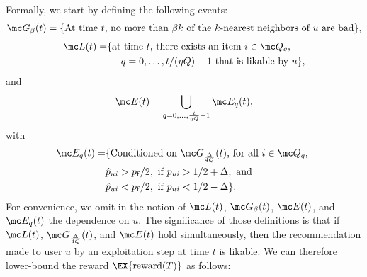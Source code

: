 \documentclass{article}
\newcommand\arewardT{\EX{\mathrm{reward}(T)}}
\newcommand\pf{p_{\mathrm{f}}}
\newcommand{\setQ}{\mc Q}
\begin{document}
%
Formally, we start by defining the following events: 
\begin{align}
\mc G_\beta(t) 
=\{\text{At time $t$, no more than $\beta k$ of the $k$-nearest neighbors of $u$ are bad} \},
\end{align}
%
\begin{align}
\mc L(t) = &\{\text{at time $t$, there exists an item $i \in \setQ_q$}, \nonumber \\
&\hspace{0.5cm}\text{$q =0,\ldots,t/(\eta Q)-1$ that is likable by $u$}\}, 
\label{eq:defLu}
\end{align}
%
and
\begin{align}
\mc E(t) = \bigcup_{q=0,\ldots,\frac{t}{\eta Q}-1} \mc E_{q}(t),
\end{align}
with
\begin{align}
\mc E_{q}(t)
=
&\{\text{Conditioned on $\mc G_{\frac{\Delta}{4Q}}(t)$, for all $i\in \setQ_q$, } \nonumber \\
&\hat p_{ui} > \pf/2, \text{ if } p_{ui} > 1/2 + \Delta,\text{ and} \nonumber \\
&\hat p_{ui} < \pf/2, \text{ if } p_{ui} < 1/2 - \Delta
\}.
\label{def:Eui} 
\end{align}
For convenience, we omit in the notion of $\mc L(t)$, $\mc G_\beta(t)$, $\mc E(t)$, and $\mc E_{q}(t)$ the dependence on $u$.   
The significance of those definitions is that if  $\mc L(t)$, $\mc G_{\frac{\Delta}{4Q}}(t)$, and $\mc E(t)$ hold simultaneously, then the recommendation made to user $u$ by an exploitation step at time $t$ is likable. 
We can therefore lower-bound the reward $\arewardT$ as follows: 
\end{document}
